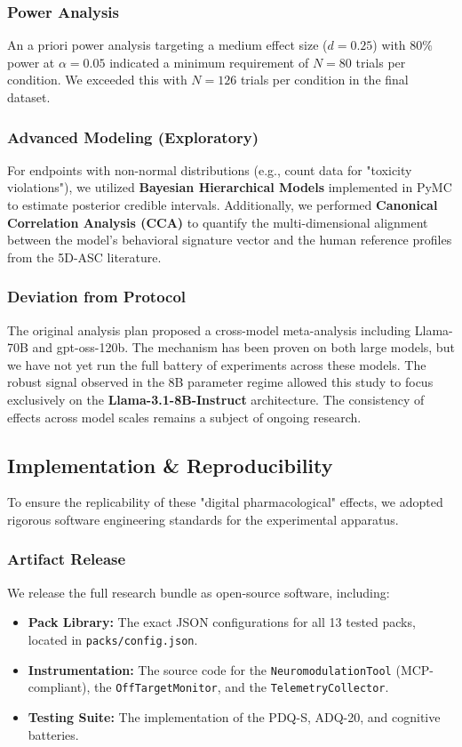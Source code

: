 \documentclass[10pt]{article}
\begin{document}
\subsubsection{Power Analysis}
An a priori power analysis targeting a medium effect size ($d=0.25$) with $80\%$ power at $\alpha=0.05$ indicated a minimum requirement of $N=80$ trials per condition. We exceeded this with $N=126$ trials per condition in the final dataset.

\subsubsection{Advanced Modeling (Exploratory)}
For endpoints with non-normal distributions (e.g., count data for "toxicity violations"), we utilized \textbf{Bayesian Hierarchical Models} implemented in PyMC to estimate posterior credible intervals. Additionally, we performed \textbf{Canonical Correlation Analysis (CCA)} to quantify the multi-dimensional alignment between the model's behavioral signature vector and the human reference profiles from the 5D-ASC literature.

\subsubsection{Deviation from Protocol}
The original analysis plan proposed a cross-model meta-analysis including Llama-70B and gpt-oss-120b. The mechanism has been proven on both large models, but we have not yet run the full battery of experiments across these models. The robust signal observed in the 8B parameter regime allowed this study to focus exclusively on the \textbf{Llama-3.1-8B-Instruct} architecture. The consistency of effects across model scales remains a subject of ongoing research.

\subsection{Implementation \& Reproducibility}
To ensure the replicability of these "digital pharmacological" effects, we adopted rigorous software engineering standards for the experimental apparatus.

\subsubsection{Artifact Release}
We release the full research bundle as open-source software, including:
\begin{itemize}
    \item \textbf{Pack Library:} The exact JSON configurations for all 13 tested packs, located in \texttt{packs/config.json}.
    \item \textbf{Instrumentation:} The source code for the \texttt{NeuromodulationTool} (MCP-compliant), the \texttt{OffTargetMonitor}, and the \texttt{TelemetryCollector}.
    \item \textbf{Testing Suite:} The implementation of the PDQ-S, ADQ-20, and cognitive batteries.
\end{itemize}
\end{document}
